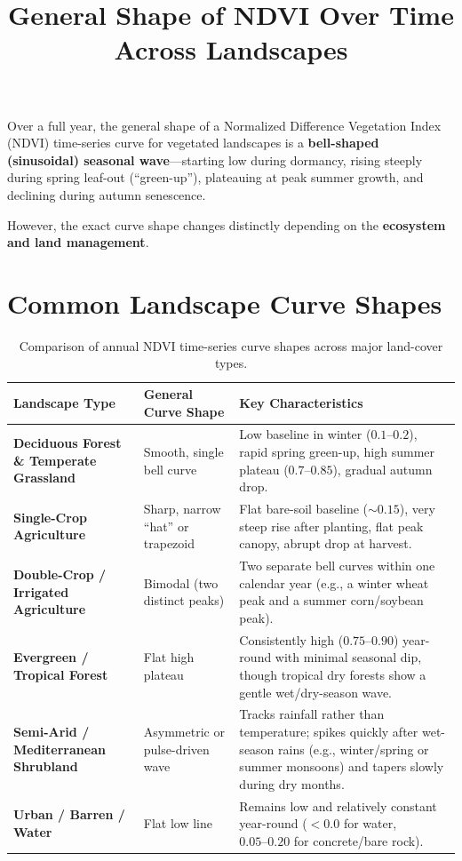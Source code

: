 \documentclass[11pt,a4paper]{article}
\title{\textbf{General Shape of NDVI Over Time Across Landscapes}}
\author{}
\date{}
\begin{document}
\maketitle

Over a full year, the general shape of a Normalized Difference Vegetation Index (NDVI) time-series curve for vegetated landscapes is a \textbf{bell-shaped (sinusoidal) seasonal wave}---starting low during dormancy, rising steeply during spring leaf-out (``green-up''), plateauing at peak summer growth, and declining during autumn senescence.

However, the exact curve shape changes distinctly depending on the \textbf{ecosystem and land management}.

\section{Common Landscape Curve Shapes}

\begin{table}[h!]
\centering
\renewcommand{\arraystretch}{1.35}
\begin{tabularx}{\textwidth}{>{\bfseries}p{3.8cm} p{3.8cm} X}
\toprule
Landscape Type & General Curve Shape & Key Characteristics \\
\midrule
Deciduous Forest \& Temperate Grassland & Smooth, single bell curve & Low baseline in winter ($0.1\text{--}0.2$), rapid spring green-up, high summer plateau ($0.7\text{--}0.85$), gradual autumn drop. \\
Single-Crop Agriculture & Sharp, narrow ``hat'' or trapezoid & Flat bare-soil baseline ($\sim 0.15$), very steep rise after planting, flat peak canopy, abrupt drop at harvest. \\
Double-Crop / Irrigated Agriculture & Bimodal (two distinct peaks) & Two separate bell curves within one calendar year (e.g., a winter wheat peak and a summer corn/soybean peak). \\
Evergreen / Tropical Forest & Flat high plateau & Consistently high ($0.75\text{--}0.90$) year-round with minimal seasonal dip, though tropical dry forests show a gentle wet/dry-season wave. \\
Semi-Arid / Mediterranean Shrubland & Asymmetric or pulse-driven wave & Tracks rainfall rather than temperature; spikes quickly after wet-season rains (e.g., winter/spring or summer monsoons) and tapers slowly during dry months. \\
Urban / Barren / Water & Flat low line & Remains low and relatively constant year-round ($< 0.0$ for water, $0.05\text{--}0.20$ for concrete/bare rock). \\
\bottomrule
\end{tabularx}
\caption{Comparison of annual NDVI time-series curve shapes across major land-cover types.}
\end{table}
\end{document}
